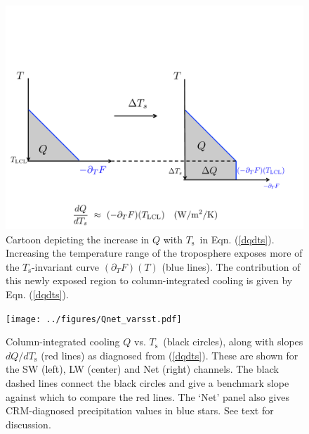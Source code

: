 \documentclass[10pt]{article}
\newcommand{\eqnref}[1]{(\ref{#1})}
\newcommand{\ppt}{\ensuremath{\partial_T}}
\newcommand{\Ts}{\ensuremath{T_\mathrm{s}}}
\begin{document}
\begin{figure}[h]
	\begin{center}
			\includegraphics[scale=0.65,trim=0cm 0cm 0cm 5cm,clip=true]{../figures/dqdts_cartoon.pdf}
		\caption{Cartoon depicting the increase in $Q$ with \Ts\ in Eqn. \eqnref{dqdts}. Increasing the temperature range of the troposphere  exposes more of the \Ts-invariant curve $(\ppt F)(T)$ (blue lines). The contribution  of this newly exposed region to column-integrated cooling is given by Eqn. \eqnref{dqdts}.
		\label{dqdts_cartoon}
		}
	\end{center}
\end{figure}


\begin{figure}[h]
	\begin{center}
			\texttt{[image: ../figures/Qnet\_varsst.pdf]}
		\caption{Column-integrated cooling $Q$ vs. \Ts\ (black circles), along with slopes $d Q/d \Ts$ (red lines) as diagnosed from \eqnref{dqdts}. These are shown for the SW (left), LW (center) and Net (right) channels.  The black dashed lines connect the black circles and give a benchmark slope against which to compare the red lines. The `Net' panel also gives CRM-diagnosed precipitation values in blue stars. See text for discussion.
		\label{Qnet_varsst}
		}
	\end{center}
\end{figure}




\end{document}
